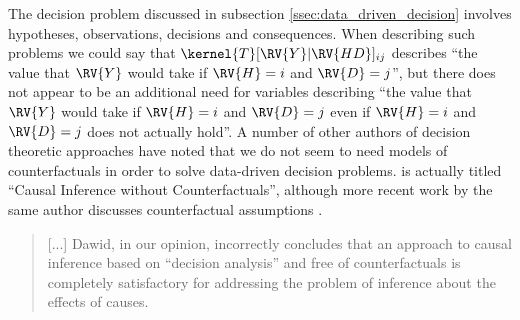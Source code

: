 The decision problem discussed in subsection \ref{ssec:data_driven_decision} involves hypotheses, observations, decisions and consequences. When describing such problems we could say that $\kernel{T}[\RV{Y}|\RV{HD}]_{ij}$ describes ``the value that $\RV{Y}$ would take if $\RV{H}=i$ and $\RV{D}=j$'', but there does not appear to be an additional need for variables describing ``the value that $\RV{Y}$ would take if $\RV{H}=i$ and $\RV{D}=j$ even if $\RV{H}=i$ and $\RV{D}=j$ does not actually hold''. A number of other authors of decision theoretic approaches have noted that we do not seem to need models of counterfactuals in order to solve data-driven decision problems. \citet{dawid_causal_2000} is actually titled ``Causal Inference without Counterfactuals'', although more recent work by the same author discusses counterfactual assumptions \citep{dawid_decision-theoretic_2020}.

\begin{quote}
[...] Dawid, in our opinion, incorrectly concludes that an approach to causal inference based on ``decision analysis'' and free of counterfactuals is completely satisfactory for addressing the problem of inference about the effects of causes.
\end{quote}